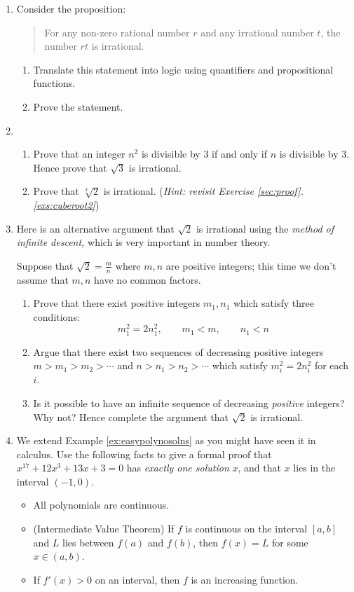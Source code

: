 \begin{exercises}{}{}
\begin{enumerate}
	\item Consider the proposition:
  \begin{quote}
      For any non-zero rational number $r$ and any irrational number $t$, the number $rt$ is irrational.
  \end{quote}
  \begin{enumerate}
      \item Translate this statement into logic using quantifiers and propositional functions.
      \item Prove the statement.
  \end{enumerate}
	
	
	\item\begin{enumerate}
	  \item Prove that an integer $n^2$ is divisible by 3 if and only if $n$ is divisible by 3. Hence prove that $\sqrt 3$ is irrational.
	  \item Prove that $\sqrt[3]{2}$ is irrational. (\emph{Hint: revisit Exercise \ref*{sec:proof}.\ref{exs:cuberoot2}}) 
	\end{enumerate}
  
  
  \item Here is an alternative argument that $\sqrt 2$ is irrational using the \emph{method of infinite descent,} which is very important in number theory.\par
  Suppose that $\sqrt 2=\frac mn$ where $m,n$ are positive integers; this time we don't assume that $m,n$ have no common factors.
  \begin{enumerate}
    \item Prove that there exist positive integers $m_1,n_1$ which satisfy three conditions:
    \[
    	m_1^2=2n_1^2,\qquad m_1<m,\qquad n_1<n
    \] 
    
    \item Argue that there exist two sequences of decreasing positive integers $m>m_1>m_2>\cdots$ and $n>n_1>n_2>\cdots$ which satisfy $m_i^2=2n_i^2$ for each $i$.
    
    \item Is it possible to have an infinite sequence of decreasing \emph{positive} integers? Why not? Hence complete the argument that $\sqrt 2$ is irrational.
	\end{enumerate}
	

  \item We extend Example \ref{ex:easypolynosolns} as you might have seen it in calculus. Use the following facts to give a formal proof that $x^{17}+12x^3+13x+3=0$ has \emph{exactly one solution} $x$, and that $x$ lies in the interval $(-1,0)$.
  \begin{itemize}
    \item All polynomials are continuous.
    \item (Intermediate Value Theorem) If $f$ is continuous on the interval $[a,b]$ and $L$ lies between $f(a)$ and $f(b)$, then $f(x)=L$ for some $x\in(a,b)$.
    \item If $f'(x)>0$ on an interval, then $f$ is an increasing function.
	\end{itemize}
	

\end{enumerate}
\end{exercises}

